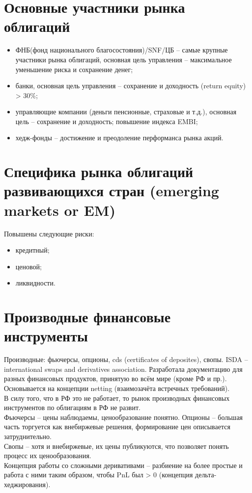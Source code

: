 \documentclass{article}
\begin{document}
\section{Основные участники рынка облигаций}
\begin{itemize}
    \item ФНБ(фонд национального благосостояния)/SNF/ЦБ -- самые крупные участники рынка облигаций, основная цель управления -- максимальное уменьшение риска и сохранение денег;
    \item банки, основная цель управления -- сохранение и доходность (return equity) > 30\%;
    \item управляющие компании (деньги пенсионные, страховые и т.д.), основная цель -- сохранение и доходность; повышение индекса EMBI;
    \item хедж-фонды -- достижение и преодоление перформанса рынка акций.
\end{itemize}
\section{Специфика рынка облигаций развивающихся стран (emerging markets or EM)}
Повышены следующие риски:
\begin{itemize}
    \item кредитный;
    \item ценовой;
    \item ликвидности.
\end{itemize}
\section{Производные финансовые инструменты}
Производные: фьючерсы, опционы, cds (certificates of deposites), свопы.
ISDA -- international swaps and derivatives association. Разработала документацию для разных финансовых продуктов, принятую во всём мире (кроме РФ и пр.). Основывается на концепции netting (взаимозачёта встречных требований).\\
В силу того, что в РФ это не работает, то рынок производных финансовых инструментов по облигациям в РФ не развит.\\
Фьючерсы -- цены наблюдаемы, ценообразование понятно.
Опционы -- большая часть торгуется как внебиржевые решения, формирование цен описывается затруднительно.\\
Свопы -- хотя и внебиржевые, их цены публикуются, что позволяет понять процесс их ценообразования.\\
Концепция работы со сложными деривативами -- разбиение на более простые и работа с ними таким образом, чтобы PnL был > 0 (концепция дельта-хеджирования).\\
\end{document}
